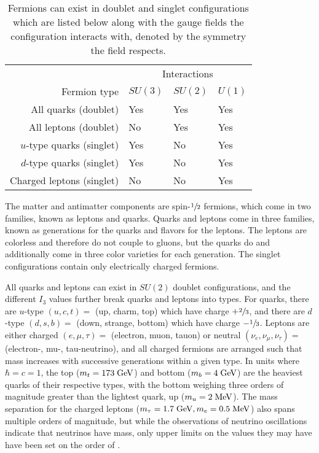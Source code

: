 \begin{table}[htb]\caption[Fermion couplings]
{
Fermions can exist in doublet and singlet configurations
 which are listed below along with the
 gauge fields the configuration interacts with,
 denoted by the symmetry the field respects. 
}
\label{tab:covarderivs}
\begin{center}
\begin{tabular}{r|l|l|l}
  \multicolumn{1}{c|}{}                       & \multicolumn{3}{c}{Interactions} \\
  Fermion type & $SU(3)$ & $SU(2)$ & $U(1)$  \\
 \hline 
 \hline 
 All quarks  (doublet)      & Yes  & Yes & Yes \\
 All leptons (doublet)      & No   & Yes & Yes \\
 $u$-type quarks (singlet)  & Yes  & No  & Yes \\
 $d$-type quarks (singlet)  & Yes  & No  & Yes \\
 Charged leptons (singlet)  & No   & No  & Yes 
\end{tabular}
\end{center}
\end{table}

 The matter and antimatter components
  are spin-$\sfrac{1}{2}$ fermions, which come
  in two families, known as leptons and quarks.
 Quarks and leptons come in three
  families, known as generations for the 
  quarks and flavors for the leptons.
 The leptons are colorless and therefore
  do not couple to gluons, but the 
  quarks do and additionally 
  come in three color varieties
  for each generation. %
 The singlet configurations contain only electrically charged
  fermions.

 All quarks and leptons can exist in $SU(2)$
  doublet configurations, and the different $I_3$ 
  values further break quarks and leptons into types.
 For quarks, there are $u$-type {$(u,c,t)=$ (up, charm, top)} which have charge $+\sfrac{2}{3}$,
  and there are $d$-type {$(d,s,b)=$ (down, strange, bottom)} which have charge $-\sfrac{1}{3}$.
 Leptons are either charged {$(e,\mu,\tau)=$ (electron, muon, tauon)}
  or neutral {$(\nu_e,\nu_\mu,\nu_\tau)=$ (electron-, mu-, tau-neutrino)},
  and all charged fermions are arranged such that mass
  increases with successive generations within a given type. 
 In units where $\hbar=c=1$, the top ($m_t=173 \;\mathrm{GeV}$)
  and bottom ($m_b=4 \;\mathrm{GeV}$) are the heaviest quarks
  of their respective types, with the bottom 
  weighing three orders of magnitude greater than 
  the lightest quark, up ($m_u=2 \;\mathrm{MeV}$).
 The mass separation for the charged leptons
  ($m_\tau=1.7 \;\mathrm{GeV}, m_e=0.5 \;\mathrm{MeV}$)
  also spans multiple orders of magnitude,
  but while the observations of neutrino oscillations
  indicate that neutrinos have mass, 
  only upper limits on the values they may have
  have been set on the order of \MeV. 

